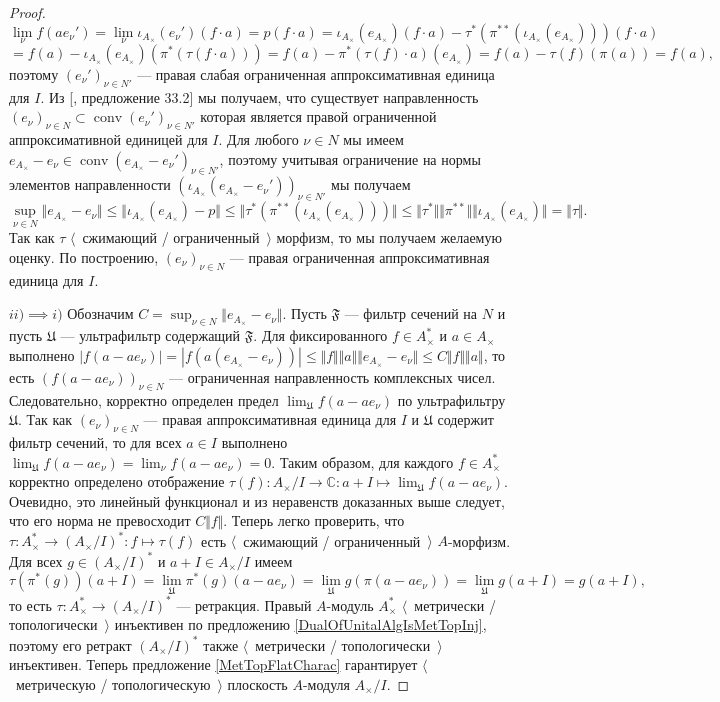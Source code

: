 \begin{proof}
$$
\lim_{\nu}f(ae_\nu')
=\lim_{\nu}\iota_{A_\times }(e_\nu')(f\cdot a)
=p(f\cdot a)
=\iota_{A_\times }(e_{A_\times })(f\cdot a)-\tau^*(\pi^{**}(\iota_{A_\times }(e_{A_\times })))(f\cdot a)
$$
$$
=f(a)-\iota_{A_\times }(e_{A_\times })(\pi^*(\tau(f\cdot a)))
=f(a)-\pi^*(\tau(f)\cdot a)(e_{A_\times })
=f(a)-\tau(f)(\pi(a))
=f(a),
$$
поэтому $(e_\nu')_{\nu\in N'}$ --- правая слабая ограниченная аппроксимативная единица для $I$. Из [\cite{AppIdAndFactorInBanAlg}, предложение 33.2] мы получаем, что существует направленность $(e_\nu)_{\nu\in N}\subset\operatorname{conv}(e_\nu')_{\nu\in N'}$ которая является правой ограниченной аппроксимативной единицей для $I$. Для любого $\nu\in N$ мы имеем $e_{A_\times }-e_\nu\in\operatorname{conv}(e_{A_\times }-e_\nu')_{\nu\in N'}$, поэтому учитывая ограничение на нормы элементов направленности $(\iota_{A_\times }(e_{A_\times }-e_\nu'))_{\nu\in N'}$ мы получаем
$$
\sup_{\nu\in N}\Vert e_{A_\times }-e_\nu\Vert
\leq\Vert \iota_{A_\times }(e_{A_\times })-p\Vert
\leq\Vert\tau^*(\pi^{**}(\iota_{A_\times }(e_{A_\times })))\Vert
\leq\Vert\tau^*\Vert\Vert\pi^{**}\Vert\Vert\iota_{A_\times }(e_{A_\times })\Vert=\Vert\tau\Vert.
$$
Так как $\tau$ $\langle$~сжимающий / ограниченный~$\rangle$ морфизм, то мы получаем желаемую оценку. По построению, $(e_\nu)_{\nu\in N}$ --- правая ограниченная аппроксимативная единица для $I$.

$ii)$$\implies$$ i)$ Обозначим $C=\sup_{\nu\in N}\Vert e_{A_\times }-e_\nu\Vert$. Пусть $\mathfrak{F}$ --- фильтр сечений на $N$ и пусть $\mathfrak{U}$ --- ультрафильтр содержащий $\mathfrak{F}$. Для фиксированного $f\in A_\times ^*$ и $a\in A_\times $ выполнено $|f(a-a e_\nu)|=|f(a(e_{A_\times }-e_\nu))|\leq\Vert f\Vert\Vert a\Vert\Vert e_{A_\times }-e_\nu\Vert\leq C\Vert f\Vert\Vert a\Vert$, то есть $(f(a-ae_\nu))_{\nu\in N}$ --- ограниченная направленность комплексных чисел. Следовательно, корректно определен предел $\lim_{\mathfrak{U}}f(a-ae_\nu)$ по ультрафильтру $\mathfrak{U}$. Так как $(e_\nu)_{\nu\in N}$ --- правая аппроксимативная единица для $I$ и $\mathfrak{U}$ содержит фильтр сечений, то для всех $a\in I$ выполнено $\lim_{\mathfrak{U}}f(a-ae_\nu)=\lim_{\nu}f(a-ae_\nu)=0$. Таким образом, для каждого $f\in A_\times ^*$ корректно определено отображение $\tau(f):A_\times /I\to \mathbb{C}:a+I\mapsto \lim_{\mathfrak{U}} f(a-ae_\nu)$. Очевидно, это линейный функционал и из неравенств доказанных выше следует, что его норма не превосходит $C\Vert f\Vert$. Теперь легко проверить, что $\tau:A_\times ^*\to (A_\times /I)^*:f\mapsto \tau(f)$ есть $\langle$~сжимающий / ограниченный~$\rangle$ $A$-морфизм. Для всех $g\in(A_\times /I)^*$ и $a+I\in A_\times /I$ имеем
$$
\tau(\pi^*(g))(a+I)
=\lim_{\mathfrak{U}}\pi^*(g)(a-ae_\nu)
=\lim_{\mathfrak{U}} g(\pi(a-ae_\nu))
=\lim_{\mathfrak{U}} g(a+I)
=g(a+I),
$$
то есть $\tau:A_\times ^*\to (A_\times /I)^*$ --- ретракция. Правый $A$-модуль $A_\times ^*$ $\langle$~метрически / топологически~$\rangle$ инъективен по предложению \ref{DualOfUnitalAlgIsMetTopInj}, поэтому его ретракт $(A_\times /I)^*$ также $\langle$~метрически / топологически~$\rangle$ инъективен. Теперь предложение \ref{MetTopFlatCharac} гарантирует $\langle$~метрическую / топологическую~$\rangle$ плоскость $A$-модуля $A_\times /I$.
\end{proof}

